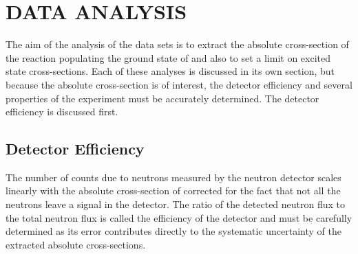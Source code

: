 %
%
%
%
%
%
%
%

%
%

\chapter{DATA ANALYSIS}
\label{chap:dataAnalysis}

The aim of the analysis of the \reaction data sets is to extract the absolute cross-section of the reaction populating the ground state of \SeProducts and also to set a limit on excited \zp state cross-sections.  Each of these analyses is discussed in its own section, but because the absolute cross-section is of interest, the detector efficiency and several properties of the experiment must be accurately determined.  The detector efficiency is discussed first.

\section{Detector Efficiency}

\label{sec:efficiency}
The number of counts due to neutrons measured by the neutron detector scales linearly with the absolute cross-section of \reaction corrected for the fact that not all the neutrons leave a signal in the detector.  The ratio of the detected neutron flux to the total neutron flux is called the efficiency of the detector and must be carefully determined as its error contributes directly to the systematic uncertainty of the extracted absolute cross-sections.

